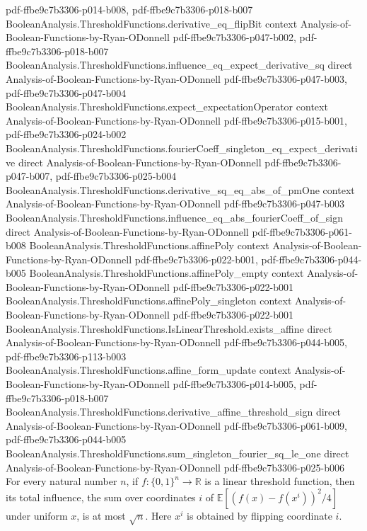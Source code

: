 \begin{theorem}
  {pdf-ffbe9c7b3306-p014-b008,
    pdf-ffbe9c7b3306-p018-b007}
\proofstep
  {BooleanAnalysis.ThresholdFunctions.derivative_eq_flipBit}
  {context}
  {Analysis-of-Boolean-Functions-by-Ryan-ODonnell}
  {pdf-ffbe9c7b3306-p047-b002,
    pdf-ffbe9c7b3306-p018-b007}
\proofstep
  {BooleanAnalysis.ThresholdFunctions.influence_eq_expect_derivative_sq}
  {direct}
  {Analysis-of-Boolean-Functions-by-Ryan-ODonnell}
  {pdf-ffbe9c7b3306-p047-b003,
    pdf-ffbe9c7b3306-p047-b004}
\proofstep
  {BooleanAnalysis.ThresholdFunctions.expect_expectationOperator}
  {context}
  {Analysis-of-Boolean-Functions-by-Ryan-ODonnell}
  {pdf-ffbe9c7b3306-p015-b001,
    pdf-ffbe9c7b3306-p024-b002}
\proofstep
  {BooleanAnalysis.ThresholdFunctions.fourierCoeff_singleton_eq_expect_derivative}
  {direct}
  {Analysis-of-Boolean-Functions-by-Ryan-ODonnell}
  {pdf-ffbe9c7b3306-p047-b007,
    pdf-ffbe9c7b3306-p025-b004}
\proofstep
  {BooleanAnalysis.ThresholdFunctions.derivative_sq_eq_abs_of_pmOne}
  {context}
  {Analysis-of-Boolean-Functions-by-Ryan-ODonnell}
  {pdf-ffbe9c7b3306-p047-b003}
\proofstep
  {BooleanAnalysis.ThresholdFunctions.influence_eq_abs_fourierCoeff_of_sign}
  {direct}
  {Analysis-of-Boolean-Functions-by-Ryan-ODonnell}
  {pdf-ffbe9c7b3306-p061-b008}
\proofstep
  {BooleanAnalysis.ThresholdFunctions.affinePoly}
  {context}
  {Analysis-of-Boolean-Functions-by-Ryan-ODonnell}
  {pdf-ffbe9c7b3306-p022-b001,
    pdf-ffbe9c7b3306-p044-b005}
\proofstep
  {BooleanAnalysis.ThresholdFunctions.affinePoly_empty}
  {context}
  {Analysis-of-Boolean-Functions-by-Ryan-ODonnell}
  {pdf-ffbe9c7b3306-p022-b001}
\proofstep
  {BooleanAnalysis.ThresholdFunctions.affinePoly_singleton}
  {context}
  {Analysis-of-Boolean-Functions-by-Ryan-ODonnell}
  {pdf-ffbe9c7b3306-p022-b001}
\proofstep
  {BooleanAnalysis.ThresholdFunctions.IsLinearThreshold.exists_affine}
  {direct}
  {Analysis-of-Boolean-Functions-by-Ryan-ODonnell}
  {pdf-ffbe9c7b3306-p044-b005,
    pdf-ffbe9c7b3306-p113-b003}
\proofstep
  {BooleanAnalysis.ThresholdFunctions.affine_form_update}
  {context}
  {Analysis-of-Boolean-Functions-by-Ryan-ODonnell}
  {pdf-ffbe9c7b3306-p014-b005,
    pdf-ffbe9c7b3306-p018-b007}
\proofstep
  {BooleanAnalysis.ThresholdFunctions.derivative_affine_threshold_sign}
  {direct}
  {Analysis-of-Boolean-Functions-by-Ryan-ODonnell}
  {pdf-ffbe9c7b3306-p061-b009,
    pdf-ffbe9c7b3306-p044-b005}
\proofstep
  {BooleanAnalysis.ThresholdFunctions.sum_singleton_fourier_sq_le_one}
  {direct}
  {Analysis-of-Boolean-Functions-by-Ryan-ODonnell}
  {pdf-ffbe9c7b3306-p025-b006}
For every natural number $n$, if $f:\{0,1\}^n\to\mathbb R$ is a linear threshold
function, then its total influence, the sum over coordinates $i$ of $\mathbb
E[(f(x)-f(x^i))^2/4]$ under uniform $x$, is at most $\sqrt n$. Here $x^i$ is obtained by
flipping coordinate $i$.
\end{theorem}
